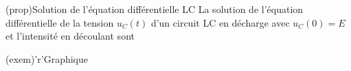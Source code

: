\documentclass[../../main/main.tex]{subfiles}
\begin{document}
\begin{tcbraster}[raster columns=2, raster equal height=rows]
	\begin{tcb}[label=prop:ucsolu](prop){Solution de l'équation
				différentielle LC}
		La solution de l'équation différentielle de la tension $u_C(t)$
		d'un circuit LC en décharge avec $u_C(0) = E$ et l'intensité en
		découlant sont
	\end{tcb}
	\begin{tcb}[width=\linewidth](exem)'r'{Graphique}
		\begin{center}
		\end{center}
	\end{tcb}
\end{tcbraster}
\end{document}
